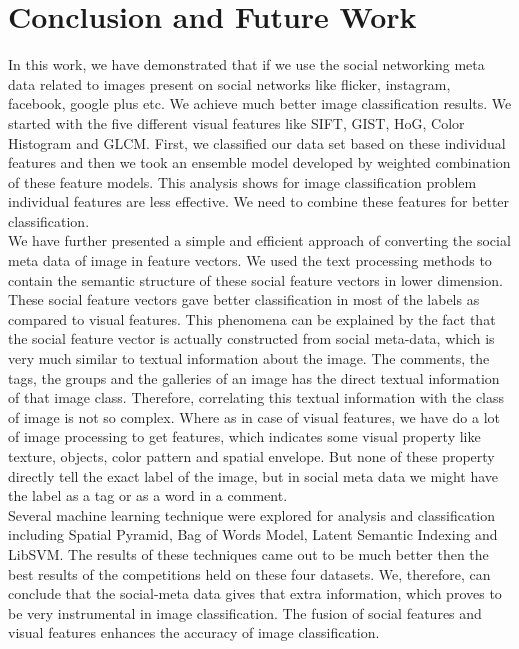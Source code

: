 
\chapter{Conclusion and Future Work} %

\label{conclusion} %

In this work, we have demonstrated that if we use the social networking meta data related to images present on social networks like flicker, instagram, facebook, google plus etc. We achieve much better image classification results. We started with the five different visual features like SIFT, GIST, HoG, Color Histogram and GLCM. First, we classified our data set based on these individual features and then we took an ensemble model developed by weighted combination of these feature models. This analysis shows for image classification problem individual features are less effective. We need to combine these features for better classification.\\
\hspace*{1cm}  We have further presented a simple and efficient approach of converting the social meta data of image in feature vectors. We used the text processing methods to contain the semantic structure of these social feature vectors in lower dimension. These  social feature vectors gave better classification in most of the labels as compared to visual features. This phenomena can be explained by the fact that the social feature vector is actually constructed from social meta-data, which is very much similar to textual information about the image. The comments, the tags, the groups and the galleries of an image has the direct textual information of that image class. Therefore, correlating this textual information with the class of image is not so complex. Where as in case of visual features, we have do a lot of image processing to get features, which indicates some visual property like texture, objects, color pattern and spatial envelope. But none of these property directly tell the exact label of the image, but in social meta data we might have the label as a tag or as a word in a comment.\\
 Several machine learning technique were explored for analysis and classification including Spatial Pyramid, Bag of Words Model, Latent Semantic Indexing and LibSVM. The results of these techniques came out to be much better then the best results of the competitions held on these four datasets. We, therefore, can conclude that the social-meta data gives that extra information, which proves to be very instrumental in image classification. The fusion of social features and visual features enhances the accuracy of image classification.
